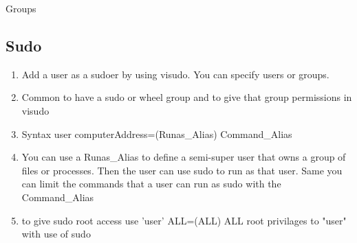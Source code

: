 \documentclass{notes}
\begin{document}
\begin{questions}{Groups}
	\begin{questionAnswer}
	\end{questionAnswer}
\end{questions}

\subsection{Sudo}
	\begin{enumerate}
		\item Add a user as a sudoer by using visudo. You can specify users or groups.
		\item Common to have a sudo or wheel group and to give that group permissions in visudo
		\item Syntax \ra user computerAddress=(Runas\_Alias) Command\_Alias
		\item You can use a Runas\_Alias to define a semi-super user that owns a group of files or processes. Then the user can use sudo to run as that user. Same you can limit the commands that a user can run as sudo  with the Command\_Alias
		\item to give sudo root access use 'user' ALL=(ALL) ALL \ra root privilages to "user" with use of sudo
	\end{enumerate}
\end{document}
